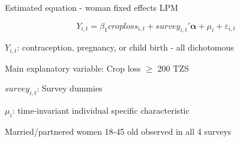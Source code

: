 \documentclass[red]{beamer}
\begin{document}
\begin{frame}{Estimated equation - woman fixed effects LPM}

\begin{equation*}
Y_{i,t} 
=  \beta_1 croploss_{i,t}  
+ survey_{i,t}'\mathbf{\alpha} 
+ \mu_i 
+ \varepsilon_{i,t} 
\end{equation*}





$Y_{i,t}$:  contraception, pregnancy, or child birth - all dichotomous 


\bigskip

Main explanatory variable: Crop loss $\geq$ 200 TZS

\bigskip

% 

$survey_{i,t}$: Survey dummies


\bigskip
 
$\mu_i$: time-invariant individual specific characteristic



\bigskip
Married/partnered women 18-45 old observed in all 4 surveys


\end{frame}
\end{document}
